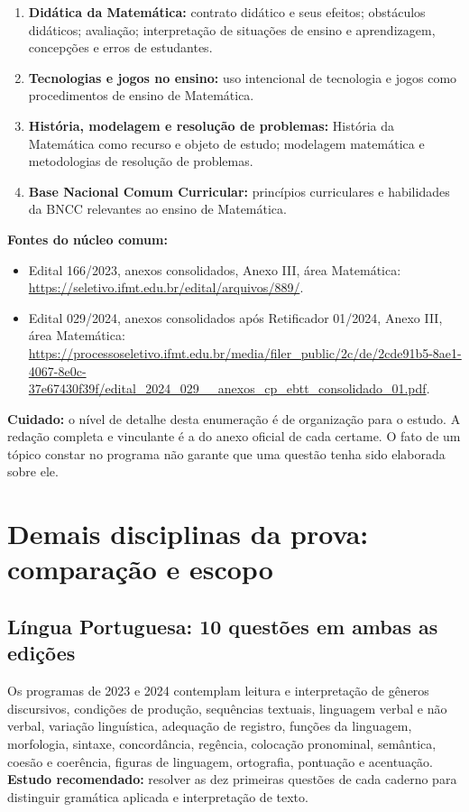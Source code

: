 \documentclass[11pt,a4paper]{article}
\begin{document}
\begin{enumerate}
\item \textbf{Didática da Matemática:} contrato didático e seus efeitos; obstáculos didáticos; avaliação; interpretação de situações de ensino e aprendizagem, concepções e erros de estudantes.
\item \textbf{Tecnologias e jogos no ensino:} uso intencional de tecnologia e jogos como procedimentos de ensino de Matemática.
\item \textbf{História, modelagem e resolução de problemas:} História da Matemática como recurso e objeto de estudo; modelagem matemática e metodologias de resolução de problemas.
\item \textbf{Base Nacional Comum Curricular:} princípios curriculares e habilidades da BNCC relevantes ao ensino de Matemática.
\end{enumerate}

\textbf{Fontes do núcleo comum:}
\begin{itemize}
\item Edital 166/2023, anexos consolidados, Anexo III, área Matemática: \url{https://seletivo.ifmt.edu.br/edital/arquivos/889/}.
\item Edital 029/2024, anexos consolidados após Retificador 01/2024, Anexo III, área Matemática: \url{https://processoseletivo.ifmt.edu.br/media/filer_public/2c/de/2cde91b5-8ae1-4067-8e0c-37e67430f39f/edital_2024_029__anexos_cp_ebtt_consolidado_01.pdf}.
\end{itemize}
\textbf{Cuidado:} o nível de detalhe desta enumeração é de organização para o estudo. A redação completa e vinculante é a do anexo oficial de cada certame. O fato de um tópico constar no programa não garante que uma questão tenha sido elaborada sobre ele.

\section{Demais disciplinas da prova: comparação e escopo}
\subsection{Língua Portuguesa: 10 questões em ambas as edições}
Os programas de 2023 e 2024 contemplam leitura e interpretação de gêneros discursivos, condições de produção, sequências textuais, linguagem verbal e não verbal, variação linguística, adequação de registro, funções da linguagem, morfologia, sintaxe, concordância, regência, colocação pronominal, semântica, coesão e coerência, figuras de linguagem, ortografia, pontuação e acentuação. \textbf{Estudo recomendado:} resolver as dez primeiras questões de cada caderno para distinguir gramática aplicada e interpretação de texto.
\end{document}
